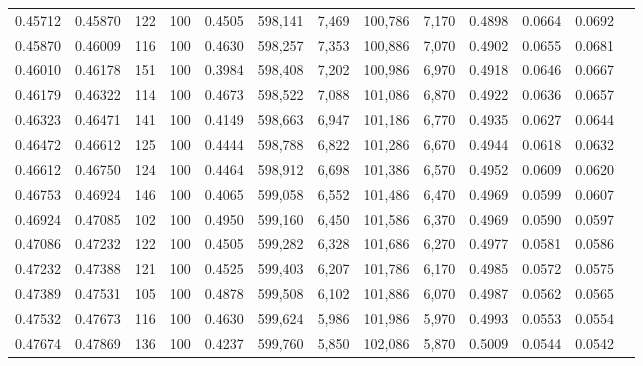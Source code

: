 \begin{tabular}{rrrrrrrrrrrrr}
0.45712 & 0.45870 &   122 & 100 &                                     0.4505 & 598,141 &   7,469 & 100,786 &   7,170 & 0.4898 & 0.0664 & 0.0692 \\
0.45870 & 0.46009 &   116 & 100 &                                     0.4630 & 598,257 &   7,353 & 100,886 &   7,070 & 0.4902 & 0.0655 & 0.0681 \\
0.46010 & 0.46178 &   151 & 100 &                                     0.3984 & 598,408 &   7,202 & 100,986 &   6,970 & 0.4918 & 0.0646 & 0.0667 \\
0.46179 & 0.46322 &   114 & 100 &                                     0.4673 & 598,522 &   7,088 & 101,086 &   6,870 & 0.4922 & 0.0636 & 0.0657 \\
0.46323 & 0.46471 &   141 & 100 &                                     0.4149 & 598,663 &   6,947 & 101,186 &   6,770 & 0.4935 & 0.0627 & 0.0644 \\
0.46472 & 0.46612 &   125 & 100 &                                     0.4444 & 598,788 &   6,822 & 101,286 &   6,670 & 0.4944 & 0.0618 & 0.0632 \\
0.46612 & 0.46750 &   124 & 100 &                                     0.4464 & 598,912 &   6,698 & 101,386 &   6,570 & 0.4952 & 0.0609 & 0.0620 \\
0.46753 & 0.46924 &   146 & 100 &                                     0.4065 & 599,058 &   6,552 & 101,486 &   6,470 & 0.4969 & 0.0599 & 0.0607 \\
0.46924 & 0.47085 &   102 & 100 &                                     0.4950 & 599,160 &   6,450 & 101,586 &   6,370 & 0.4969 & 0.0590 & 0.0597 \\
0.47086 & 0.47232 &   122 & 100 &                                     0.4505 & 599,282 &   6,328 & 101,686 &   6,270 & 0.4977 & 0.0581 & 0.0586 \\
0.47232 & 0.47388 &   121 & 100 &                                     0.4525 & 599,403 &   6,207 & 101,786 &   6,170 & 0.4985 & 0.0572 & 0.0575 \\
0.47389 & 0.47531 &   105 & 100 &                                     0.4878 & 599,508 &   6,102 & 101,886 &   6,070 & 0.4987 & 0.0562 & 0.0565 \\
0.47532 & 0.47673 &   116 & 100 &                                     0.4630 & 599,624 &   5,986 & 101,986 &   5,970 & 0.4993 & 0.0553 & 0.0554 \\
0.47674 & 0.47869 &   136 & 100 &                                     0.4237 & 599,760 &   5,850 & 102,086 &   5,870 & 0.5009 & 0.0544 & 0.0542 \\

\end{tabular}
